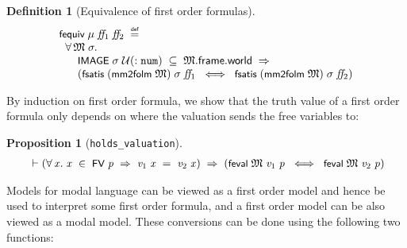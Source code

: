 \documentclass[letterpaper]{article}
\newtheorem{defn}{Definition}
\newtheorem{prop}{Proposition}
\renewcommand{\HOLConst}[1]{{\textsf{\upshape\small #1}}}
\newenvironment{holmath}{\begin{displaymath}\begin{array}{l}}{\end{array}\end{displaymath}\ignorespacesafterend}
\begin{document}
\begin{defn}[Equivalence of first order formulas]
\begin{holmath}
  \HOLConst{fequiv}\;\HOLFreeVar{\ensuremath{\mu}}\;\HOLFreeVar{ff\sb{\mathrm{1}}}\;\HOLFreeVar{ff\sb{\mathrm{2}}}\;\HOLSymConst{\HOLTokenDefEquality{}}\\
\;\;\HOLSymConst{\HOLTokenForall{}}\HOLBoundVar{\ensuremath{\mathfrak{M}}}\;\HOLBoundVar{\ensuremath{\sigma}}.\\
\;\;\;\;\;\;\HOLConst{IMAGE}\;\HOLBoundVar{\ensuremath{\sigma}}\;\ensuremath{\cal{U}}(:\HOLTyOp{num})\;\HOLSymConst{\HOLTokenSubset{}}\;\HOLBoundVar{\ensuremath{\mathfrak{M}}}.\HOLFieldName{frame}.\HOLFieldName{world}\;\HOLSymConst{\HOLTokenImp{}}\\
\;\;\;\;\;\;(\HOLConst{fsatis}\;(\HOLConst{mm2folm}\;\HOLBoundVar{\ensuremath{\mathfrak{M}}})\;\HOLBoundVar{\ensuremath{\sigma}}\;\HOLFreeVar{ff\sb{\mathrm{1}}}\;\HOLSymConst{\HOLTokenEquiv{}}\;\HOLConst{fsatis}\;(\HOLConst{mm2folm}\;\HOLBoundVar{\ensuremath{\mathfrak{M}}})\;\HOLBoundVar{\ensuremath{\sigma}}\;\HOLFreeVar{ff\sb{\mathrm{2}}})
\end{holmath}
\end{defn}

By induction on first order formula, we show that the truth value of a first order formula only depends on where the valuation sends the free variables to:
\begin{prop}[\texttt{holds_valuation}]
\begin{holmath}
  \ensuremath{\HOLTokenTurnstile}(\HOLSymConst{\HOLTokenForall{}}\HOLBoundVar{x}.\;\HOLBoundVar{x}\;\HOLSymConst{\HOLTokenIn{}}\;\HOLConst{FV}\;\HOLFreeVar{p}\;\HOLSymConst{\HOLTokenImp{}}\;\HOLFreeVar{v\sb{\mathrm{1}}}\;\HOLBoundVar{x}\;\HOLSymConst{=}\;\HOLFreeVar{v\sb{\mathrm{2}}}\;\HOLBoundVar{x})\;\HOLSymConst{\HOLTokenImp{}}\;(\HOLConst{feval}\;\HOLFreeVar{\ensuremath{\mathfrak{M}}}\;\HOLFreeVar{v\sb{\mathrm{1}}}\;\HOLFreeVar{p}\;\HOLSymConst{\HOLTokenEquiv{}}\;\HOLConst{feval}\;\HOLFreeVar{\ensuremath{\mathfrak{M}}}\;\HOLFreeVar{v\sb{\mathrm{2}}}\;\HOLFreeVar{p})
\end{holmath}
\end{prop}

Models for modal language can be viewed as a first order model and hence be used to interpret some first order formula, and a first order model can be also viewed as a modal model. These conversions can be done using the following two functions:
\end{document}
